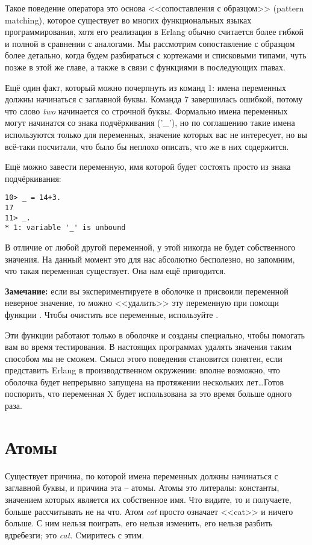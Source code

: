 Такое поведение оператора \ops{\strut=} это основа <<сопоставления с образцом>> (pattern matching), которое существует во многих функциональных языках программирования, хотя его реализация в Erlang обычно считается более гибкой и полной в сравнении с аналогами.
Мы рассмотрим сопоставление с образцом более детально, когда будем разбираться с кортежами и списковыми типами, чуть позже в этой же главе, а также в связи с функциями в последующих главах.

Ещё один факт, который можно почерпнуть из команд 1: имена переменных должны начинаться с заглавной буквы.
Команда 7 завершилась ошибкой, потому что слово \emph{two} начинается со строчной буквы.
Формально имена переменных  могут начинатся со знака подчёркивания ('\_'), но по соглашению такие имена используются только для переменных, значение которых вас не интересует, но вы всё\--таки посчитали, что было бы неплохо описать, что же в них содержится.

Ещё можно завести переменную, имя которой будет состоять просто из знака подчёркивания:
\begin{lstlisting}[style=repl]
10> _ = 14+3.
17
11> _.
* 1: variable '_' is unbound
\end{lstlisting}

В отличие от любой другой переменной, у этой никогда не будет собственного значения.
На данный момент это для нас абсолютно бесполезно, но запомним, что такая переменная существует.
Она нам ещё пригодится.\\ 
\colorbox{lgray}
{
\begin{minipage}{1.0\linewidth}
\textbf{Замечание:} если вы экспериментируете в оболочке и присвоили переменной неверное значение, то можно <<удалить>> эту переменную при помощи функции .
Чтобы очистить все переменные, используйте .
\par 
Эти функции работают только в оболочке и созданы специально, чтобы помогать вам во время тестирования.
В настоящих программах удалять значения таким способом мы не сможем.
Смысл этого поведения становится понятен, если представить Erlang в производственном окружении: вполне возможно, что оболочка будет непрерывно запущена на протяжении нескольких лет\ldots Готов поспорить, что переменная X будет использована за это время больше одного раза.
\end{minipage}
}
\section{Атомы}
\label{atoms}
Существует причина, по которой имена переменных должны начинаться с заглавной буквы, и причина эта \--- атомы.
Атомы это литералы: константы, значением которых является их собственное имя.
Что видите, то и получаете, больше рассчитывать не на что.
Атом \emph{cat} просто означает <<cat>> и ничего больше.
С ним нельзя поиграть, его нельзя изменить, его нельзя разбить вдребезги; это \emph{cat}.
Cмиритесь с этим.

